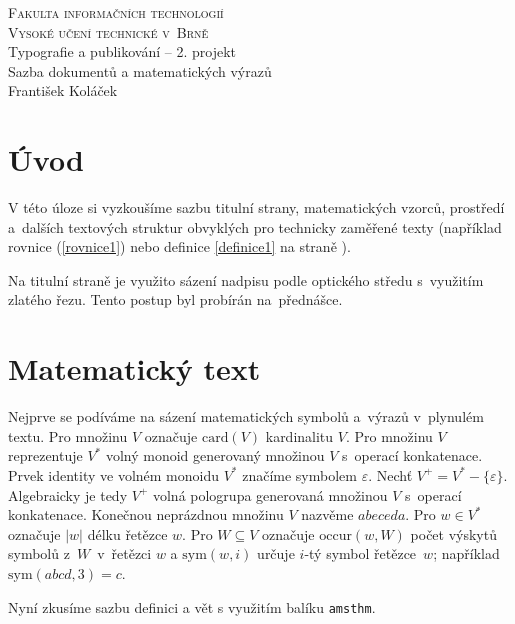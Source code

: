 \documentclass[a4paper, 11pt, twocolumn, czech]{article}
\theoremstyle{definition}
\theoremstyle{definition}
\theoremstyle{definition}
\theoremstyle{definition}
\begin{document}
\begin{titlepage}
\begin{center}
\huge
\textsc{Fakulta informačních technologií}\\
[-0.4mm]
\textsc{Vysoké učení technické v~Brně}\\
\LARGE
Typografie a publikování -- 2. projekt
\\[-1.2mm]
Sazba dokumentů a matematických výrazů\\
\Large
\the\year\hfill František Koláček
\end{center}
\end{titlepage}

\section*{Úvod}
V této úloze si vyzkoušíme sazbu titulní strany, matema\-tických vzorců, prostředí a~dalších textových struktur obvyklých pro technicky zaměřené texty (například rovnice (\ref{rovnice1}) nebo definice \ref{definice1} na straně \pageref{definice1}).

Na titulní straně je využito sázení nadpisu podle op\-tického středu s~využitím zlatého řezu. Tento postup byl probírán na~přednášce.

\section{Matematický text}
Nejprve se podíváme na sázení matematických symbolů a~výrazů v~plynulém textu. Pro množinu $V$ označuje $\mathrm{card}(V)$ kardinalitu $V$. Pro množinu $V$ reprezentuje $V^*$ volný monoid generovaný množinou $V$ s~operací konka\-tenace. Prvek identity ve volném monoidu $V^*$ značíme symbolem $\varepsilon$. Nechť $V^+ = V^* - \{ \varepsilon \}$. Algebraicky je tedy $V^+$ volná pologrupa generovaná množinou $V$ s~operací konkatenace. Konečnou neprázdnou množinu $V$ nazvěme $abeceda$. Pro $w \in V^*$ označuje $|w|$ délku řetězce $w$. Pro $W \subseteq V$ označuje $\mathrm{occur}(w, W)$ počet výskytů symbolů z~$W$~v~řetězci $w$ a $\mathrm{sym}(w, i)$ určuje $i$-tý symbol řetězce~$w$; například $\mathrm{sym}(abcd, 3) = c$.

Nyní zkusíme sazbu definici a vět s využitím balíku \texttt{amsthm}.
\end{document}
